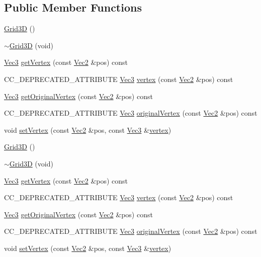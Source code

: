 \subsection*{Public Member Functions}
\begin{DoxyCompactItemize}
\item 
\hyperlink{classGrid3D_acfa00d6c0229c8c03a7c6e9ff05849c7}{Grid3D} ()
\item 
\hyperlink{classGrid3D_a84b24f5cd01d2150dd8771b1dac7070a}{$\sim$\+Grid3D} (void)
\item 
\hyperlink{classVec3}{Vec3} \hyperlink{classGrid3D_aa39962eba8aa705b6b45115ff74a0c6a}{get\+Vertex} (const \hyperlink{classVec2}{Vec2} \&pos) const
\item 
C\+C\+\_\+\+D\+E\+P\+R\+E\+C\+A\+T\+E\+D\+\_\+\+A\+T\+T\+R\+I\+B\+U\+TE \hyperlink{classVec3}{Vec3} \hyperlink{classGrid3D_afa1183496d0a092d1b95acc423a13514}{vertex} (const \hyperlink{classVec2}{Vec2} \&pos) const
\item 
\hyperlink{classVec3}{Vec3} \hyperlink{classGrid3D_a02428c7bc60ac15aa12448bb63613647}{get\+Original\+Vertex} (const \hyperlink{classVec2}{Vec2} \&pos) const
\item 
C\+C\+\_\+\+D\+E\+P\+R\+E\+C\+A\+T\+E\+D\+\_\+\+A\+T\+T\+R\+I\+B\+U\+TE \hyperlink{classVec3}{Vec3} \hyperlink{classGrid3D_a2bc02321767e3b79260f11d5c958f750}{original\+Vertex} (const \hyperlink{classVec2}{Vec2} \&pos) const
\item 
void \hyperlink{classGrid3D_a7612c4071bf59e12edb5107eb8f8332f}{set\+Vertex} (const \hyperlink{classVec2}{Vec2} \&pos, const \hyperlink{classVec3}{Vec3} \&\hyperlink{classGrid3D_afa1183496d0a092d1b95acc423a13514}{vertex})
\item 
\hyperlink{classGrid3D_acfa00d6c0229c8c03a7c6e9ff05849c7}{Grid3D} ()
\item 
\hyperlink{classGrid3D_a84b24f5cd01d2150dd8771b1dac7070a}{$\sim$\+Grid3D} (void)
\item 
\hyperlink{classVec3}{Vec3} \hyperlink{classGrid3D_aa39962eba8aa705b6b45115ff74a0c6a}{get\+Vertex} (const \hyperlink{classVec2}{Vec2} \&pos) const
\item 
C\+C\+\_\+\+D\+E\+P\+R\+E\+C\+A\+T\+E\+D\+\_\+\+A\+T\+T\+R\+I\+B\+U\+TE \hyperlink{classVec3}{Vec3} \hyperlink{classGrid3D_afa1183496d0a092d1b95acc423a13514}{vertex} (const \hyperlink{classVec2}{Vec2} \&pos) const
\item 
\hyperlink{classVec3}{Vec3} \hyperlink{classGrid3D_a02428c7bc60ac15aa12448bb63613647}{get\+Original\+Vertex} (const \hyperlink{classVec2}{Vec2} \&pos) const
\item 
C\+C\+\_\+\+D\+E\+P\+R\+E\+C\+A\+T\+E\+D\+\_\+\+A\+T\+T\+R\+I\+B\+U\+TE \hyperlink{classVec3}{Vec3} \hyperlink{classGrid3D_a2bc02321767e3b79260f11d5c958f750}{original\+Vertex} (const \hyperlink{classVec2}{Vec2} \&pos) const
\item 
void \hyperlink{classGrid3D_a7612c4071bf59e12edb5107eb8f8332f}{set\+Vertex} (const \hyperlink{classVec2}{Vec2} \&pos, const \hyperlink{classVec3}{Vec3} \&\hyperlink{classGrid3D_afa1183496d0a092d1b95acc423a13514}{vertex})
\end{DoxyCompactItemize}
